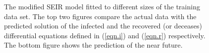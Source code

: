 \documentclass[conference]{IEEEtran}
\begin{document}
\begin{figure}[!t]
    \centering
    \hfil
    
    \hfil
    
    
    \caption{The modified SEIR model fitted to different sizes of the training data set. The top two figures compare the actual data with the predicted solution of the infected and the recovered (or deceases) differential equations defined in (\ref{eqn.i}) and (\ref{eqn.r}) respectively. The bottom figure shows the prediction of the near future.}
    \label{fig.seirfit}
\end{figure}
\end{document}
